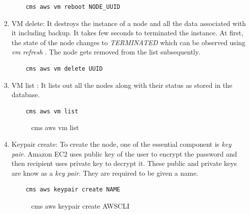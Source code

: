 \documentclass[9pt,twocolumn,twoside]{../../styles/osajnl}
\begin{document}
\begin{enumerate}
    \begin{verbatim}
    cms aws vm reboot NODE_UUID
    \end{verbatim}
    
    \item VM delete: It destroys the instance of a node and all the data associated with it including backup. It takes few seconds to terminated the instance. At first, the state of the node changes to \textit{TERMINATED} which can be observed using \textit{vm refresh} . The node gets removed from the list subsequently. 
    
    \begin{verbatim}
    cms aws vm delete UUID
    \end{verbatim}
    
    \item VM list : It lists out all the nodes along with their status as stored in the database.
    
    \begin{verbatim}
    cms aws vm list
    \end{verbatim}
    
     \begin{figure}[h!]
    	\centering
    	\caption{cms aws vm list }
    	\label{fig:vmlist}
    \end{figure}

    \item Keypair create: To create the node, one of the essential component is \textit{key pair}. Amazon EC2 uses public key of the user to encrypt the password and then recipient uses private key to decrypt it. These public and private keys are know as a \textit{key pair}. They are required to be given a name.
    
    \begin{verbatim}
    cms aws keypair create NAME
    \end{verbatim}
    
    \begin{figure}[h!]
    	\centering
    	\caption{cms aws keypair create AWSCLI}
    	\label{fig:keypaircreate}
    \end{figure}


\end{enumerate}
\end{document}
